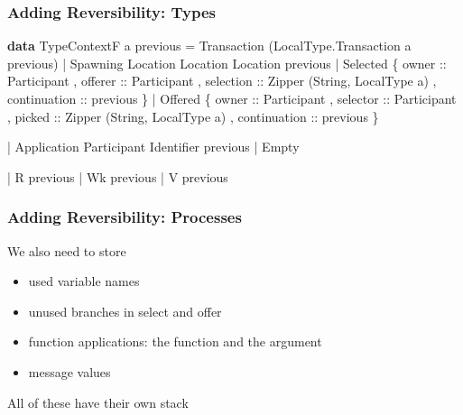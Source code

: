 \documentclass[12pt]{beamer}
\newenvironment{Shaded}{}{}
\newcommand{\KeywordTok}[1]{\textcolor[rgb]{0.00,0.44,0.13}{\textbf{#1}}}
\newcommand{\DataTypeTok}[1]{\textcolor[rgb]{0.56,0.13,0.00}{#1}}
\newcommand{\OtherTok}[1]{\textcolor[rgb]{0.00,0.44,0.13}{#1}}
\newcommand{\FunctionTok}[1]{\textcolor[rgb]{0.02,0.16,0.49}{#1}}
\newcommand{\NormalTok}[1]{#1}
\begin{document}
\begin{frame}[fragile]
\frametitle{Adding Reversibility: Types}

\begin{Shaded}
\begin{Highlighting}[]
\KeywordTok{data} \DataTypeTok{TypeContextF}\NormalTok{ a previous }
    \FunctionTok{=} \DataTypeTok{Transaction}\NormalTok{ (}\DataTypeTok{LocalType.Transaction}\NormalTok{ a previous)}
    \FunctionTok{|} \DataTypeTok{Spawning} \DataTypeTok{Location} \DataTypeTok{Location} \DataTypeTok{Location}\NormalTok{ previous}
    \FunctionTok{|} \DataTypeTok{Selected} 
\NormalTok{        \{}\OtherTok{ owner ::} \DataTypeTok{Participant}
\NormalTok{        ,}\OtherTok{ offerer ::} \DataTypeTok{Participant} 
\NormalTok{        ,}\OtherTok{ selection ::} \DataTypeTok{Zipper}\NormalTok{ (}\DataTypeTok{String}\NormalTok{, }\DataTypeTok{LocalType}\NormalTok{ a)}
\NormalTok{        ,}\OtherTok{ continuation ::}\NormalTok{ previous }
\NormalTok{        \}}
    \FunctionTok{|} \DataTypeTok{Offered} 
\NormalTok{        \{}\OtherTok{ owner ::} \DataTypeTok{Participant}
\NormalTok{        ,}\OtherTok{ selector ::} \DataTypeTok{Participant} 
\NormalTok{        ,}\OtherTok{ picked ::} \DataTypeTok{Zipper}\NormalTok{ (}\DataTypeTok{String}\NormalTok{, }\DataTypeTok{LocalType}\NormalTok{ a)}
\NormalTok{        ,}\OtherTok{ continuation ::}\NormalTok{ previous }
\NormalTok{        \}}

    \FunctionTok{|} \DataTypeTok{Application} \DataTypeTok{Participant} \DataTypeTok{Identifier}\NormalTok{ previous }
    \FunctionTok{|} \DataTypeTok{Empty} 

    \FunctionTok{|} \DataTypeTok{R}\NormalTok{ previous  }
    \FunctionTok{|} \DataTypeTok{Wk}\NormalTok{ previous}
    \FunctionTok{|} \DataTypeTok{V}\NormalTok{ previous}
\end{Highlighting}
\end{Shaded}

\end{frame}

\begin{frame}[fragile]
\frametitle{Adding Reversibility: Processes}

We also need to store

\begin{itemize}
    \item used variable names
    \item unused branches in select and offer 
    \item function applications: the function and the argument
    \item message values
\end{itemize}

All of these have their own stack

\end{frame}
\end{document}
